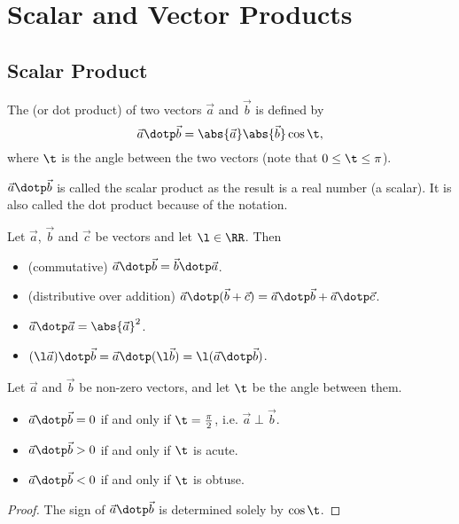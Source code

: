\chapter{Scalar and Vector Products}

\section{Scalar Product}

\begin{definition}
    The  (or dot product) of two vectors $\vec a$ and $\vec b$ is defined by \[\vec a \dotp \vec b = \abs{\vec a} \abs{\vec b} \cos \t,\] where $\t$ is the angle between the two vectors (note that $0 \leq \t \leq \pi$).
\end{definition}
\begin{remark}
    $\vec a \dotp \vec b$ is called the scalar product as the result is a real number (a scalar). It is also called the dot product because of the notation.
\end{remark}

\begin{fact}
    Let $\vec a$, $\vec b$ and $\vec c$ be vectors and let $\l \in \RR$. Then
    \begin{itemize}
        \item (commutative) $\vec a \dotp \vec b = \vec b \dotp \vec a$.
        \item (distributive over addition) $\vec a \dotp (\vec b + \vec c) = \vec a \dotp \vec b + \vec a \dotp \vec c$.
        \item $\vec a \dotp \vec a = \abs{\vec a}^2$.
        \item $(\l \vec a) \dotp \vec b = \vec a \dotp (\l \vec b) = \l (\vec a \dotp \vec b)$.
    \end{itemize}
\end{fact}

\begin{proposition}
    Let $\vec a$ and $\vec b$ be non-zero vectors, and let $\t$ be the angle between them.
    \begin{itemize}
        \item $\vec a \dotp \vec b = 0$ if and only if $\t = \frac\pi2$, i.e. $\vec a \perp \vec b$.
        \item $\vec a \dotp \vec b > 0$ if and only if $\t$ is acute.
        \item $\vec a \dotp \vec b < 0$ if and only if $\t$ is obtuse.
    \end{itemize}
\end{proposition}
\begin{proof}
    The sign of $\vec a \dotp \vec b$ is determined solely by $\cos \t$.
\end{proof}

